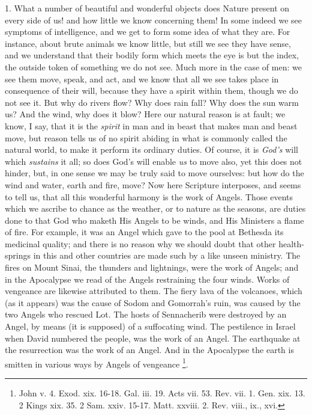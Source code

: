 1. What a number of beautiful and wonderful objects does Nature
present on every side of us! and how little we know concerning them! In
some indeed we see symptoms of intelligence, and we get to form some
idea of what they are. For instance, about brute animals we know little,
but still we see they have sense, and we understand that their bodily
form which meets the eye is but the index, the outside token of
something we do not see. Much more in the case of men: we see them move,
speak, and act, and we know that all we see takes place in consequence
of their will, because they have a spirit within them, though we do not
see it. But why do rivers flow? Why does rain fall? Why does the sun
warm us? And the wind, why does it blow? Here our natural reason is at
fault; we know, I say, that it is the \emph{spirit} in man and in beast
that makes man and beast move, but reason tells us of no spirit abiding
in what is commonly called the natural world, to make it perform its
ordinary duties. Of course, it is \emph{God's} will which \emph{sustains}
it all; so does God's will enable \emph{us} to move also, yet this does
not hinder, but, in one sense we may be truly said to move ourselves:
but how do the wind and water, earth and fire, move? Now here Scripture
interposes, and seems to tell us, that all this wonderful harmony is the
work of Angels. Those events which we ascribe to chance as the weather,
or to nature as the seasons, are duties done to that God who maketh His
Angels to be winds, and His Ministers a flame of fire. For example, it
was an Angel which gave to the pool at Bethesda its medicinal quality;
and there is no reason why we should doubt that other health-springs in
this and other countries are made such by a like unseen ministry. The
fires on Mount Sinai, the thunders and lightnings, were the work of
Angels; and in the Apocalypse we read of the Angels restraining the four
winds. Works of vengeance are likewise attributed to them. The fiery
lava of the volcanoes, which (as it appears) was the cause of Sodom and
Gomorrah's ruin, was caused by the two Angels who rescued Lot. The hosts
of Sennacherib were destroyed by an Angel, by means (it is supposed) of
a suffocating wind. The pestilence in Israel when David numbered the
people, was the work of an Angel. The earthquake at the resurrection was
the work of an Angel. And in the Apocalypse the earth is smitten in
various ways by Angels of vengeance \footnote{John v. 4. Exod. xix. 16-18. Gal. iii. 19.
Acts vii. 53. Rev. vii. 1. Gen. xix. 13. 2 Kings xix. 35. 2 Sam. xxiv.
15-17. Matt. xxviii. 2. Rev. viii., ix., xvi.}.

